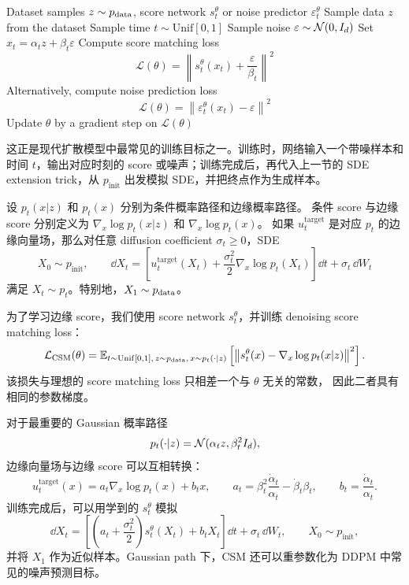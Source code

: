 \begin{algorithm}
\caption{Score Matching Training Procedure for Gaussian Probability Path}
\begin{algorithmic}[1]
\Require Dataset samples $z\sim p_{\mathrm{data}}$, score network $s_t^\theta$ or noise predictor $\varepsilon_t^\theta$
    \State Sample data $z$ from the dataset
    \State Sample time $t\sim \mathrm{Unif}[0,1]$
    \State Sample noise $\varepsilon\sim\mathcal{N}(0,I_d)$
    \State Set $x_t=\alpha_t z+\beta_t\varepsilon$
    \State Compute score matching loss
    \[
    \mathcal{L}(\theta)
    =
    \left\|
    s_t^\theta(x_t)+\frac{\varepsilon}{\beta_t}
    \right\|^2
    \]
    \State Alternatively, compute noise prediction loss
    \[
    \mathcal{L}(\theta)
    =
    \left\|
    \varepsilon_t^\theta(x_t)-\varepsilon
    \right\|^2
    \]
    \State Update $\theta$ by a gradient step on $\mathcal{L}(\theta)$
\EndFor
\end{algorithmic}
\end{algorithm}

这正是现代扩散模型中最常见的训练目标之一。训练时，网络输入一个带噪样本和时间
$t$，输出对应时刻的 score 或噪声；训练完成后，再代入上一节的 SDE extension
trick，从 $p_{\mathrm{init}}$ 出发模拟 SDE，并把终点作为生成样本。

\begin{summarybox}
设 $p_t(x|z)$ 和 $p_t(x)$ 分别为条件概率路径和边缘概率路径。
条件 score 与边缘 score 分别定义为 $\nabla_x\log p_t(x|z)$ 和 $\nabla_x\log p_t(x)$。
如果 $u_t^{\mathrm{target}}$ 是对应 $p_t$ 的边缘向量场，那么对任意
diffusion coefficient $\sigma_t\ge 0$，SDE
\[
  X_0\sim p_{\mathrm{init}},
  \qquad
  \dd X_t=
  \left[
    u_t^{\mathrm{target}}(X_t)
    +\frac{\sigma_t^2}{2}\nabla_x\log p_t(X_t)
  \right]\dd t
  +\sigma_t\,\dd W_t
\]
满足 $X_t\sim p_t$。特别地，$X_1\sim p_{\mathrm{data}}$。

为了学习边缘 score，我们使用 score network $s_t^\theta$，并训练
denoising score matching loss：
\[
  \mathcal{L}_{\mathrm{CSM}}(\theta)
  =
  \mathbb{E}_{t\sim\mathrm{Unif}[0,1],\,z\sim p_{\mathrm{data}},\,x\sim p_t(\cdot|z)}
  \left[
    \left\|
    s_t^\theta(x)-\nabla_x\log p_t(x|z)
    \right\|^2
  \right].
\]
该损失与理想的 score matching loss 只相差一个与 $\theta$ 无关的常数，
因此二者具有相同的参数梯度。

对于最重要的 Gaussian 概率路径
\[
  p_t(\cdot|z)=\mathcal{N}(\alpha_t z,\beta_t^2I_d),
\]
边缘向量场与边缘 score 可以互相转换：
\[
  u_t^{\mathrm{target}}(x)
  =
  a_t\nabla_x\log p_t(x)+b_tx,
  \qquad
  a_t=\beta_t^2\frac{\dot\alpha_t}{\alpha_t}-\dot\beta_t\beta_t,
  \qquad
  b_t=\frac{\dot\alpha_t}{\alpha_t}.
\]
训练完成后，可以用学到的 $s_t^\theta$ 模拟
\[
  \dd X_t
  =
  \left[
    \left(a_t+\frac{\sigma_t^2}{2}\right)s_t^\theta(X_t)
    +b_tX_t
  \right]\dd t
  +\sigma_t\,\dd W_t,
  \qquad
  X_0\sim p_{\mathrm{init}},
\]
并将 $X_1$ 作为近似样本。Gaussian path 下，CSM 还可以重参数化为
DDPM 中常见的噪声预测目标。
\end{summarybox}
